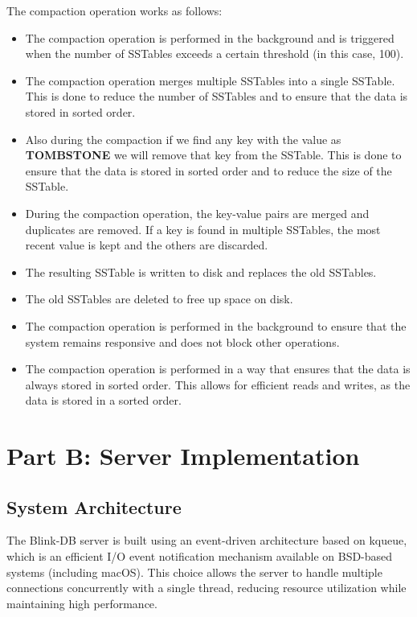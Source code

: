 \documentclass{article}
\begin{document}
\noindent The compaction operation works as follows:
\begin{itemize}
    \item The compaction operation is performed in the background and is triggered when the number of SSTables exceeds a certain threshold (in this case, 100).
    \item The compaction operation merges multiple SSTables into a single SSTable. This is done to reduce the number of SSTables and to ensure that the data is stored in sorted order.
    \item Also during the compaction if we find any key with the value as \textbf{TOMBSTONE} we will remove that key from the SSTable. This is done to ensure that the data is stored in sorted order and to reduce the size of the SSTable.
    \item During the compaction operation, the key-value pairs are merged and duplicates are removed. If a key is found in multiple SSTables, the most recent value is kept and the others are discarded.
    \item The resulting SSTable is written to disk and replaces the old SSTables.
    \item The old SSTables are deleted to free up space on disk.
    \item The compaction operation is performed in the background to ensure that the system remains responsive and does not block other operations.
    \item The compaction operation is performed in a way that ensures that the data is always stored in sorted order. This allows for efficient reads and writes, as the data is stored in a sorted order.
\end{itemize}

\section{Part B: Server Implementation}

\subsection{System Architecture}

The Blink-DB server is built using an event-driven architecture based on kqueue, which is an efficient I/O event notification mechanism available on BSD-based systems (including macOS). This choice allows the server to handle multiple connections concurrently with a single thread, reducing resource utilization while maintaining high performance.
\end{document}
